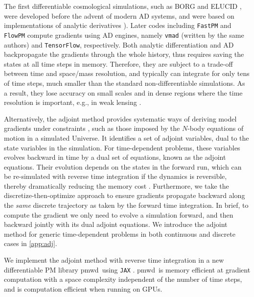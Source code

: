 \documentclass[modern, trackchanges, dvipsnames]{aastex631}
\newcommand{\pmwd}{{\usefont{T1}{nova}{m}{sl}pmwd}}
\begin{document}
The first differentiable cosmological simulations, such as BORG and
ELUCID \citep{BORG, ELUCID}, were developed before the advent of modern
AD systems, and were based on implementations of analytic derivatives
\citep[see e.g.,][App.~D]{SeljakEtAl2017}).
Later codes including \texttt{FastPM} and \texttt{FlowPM} \citep{FastPM,
vmad, SeljakEtAl2017, FlowPM} compute gradients using AD engines, namely
\texttt{vmad} (written by the same authors) and \texttt{TensorFlow},
respectively.
Both analytic differentiation and AD backpropagate the gradients through
the whole history, thus requires saving the states at all time steps in
memory.
Therefore, they are subject to a trade-off between time and space/mass
resolution, and typically can integrate for only tens of time steps,
much smaller than the standard non-differentiable simulations.
As a result, they lose accuracy on small scales and in dense regions
where the time resolution is important, e.g., in weak lensing
\citep{MADLens}.

Alternatively, the adjoint method provides systematic ways of deriving
model gradients under constraints \citep{Pontryagin1962}, such as those
imposed by the $N$-body equations of motion in a simulated Universe.
It identifies a set of adjoint variables, dual to the state variables in
the simulation.
For time-dependent problems, these variables evolves backward in time by
a dual set of equations, known as the adjoint equations.
Their evolution depends on the states in the forward run, which can be
re-simulated with reverse time integration if the dynamics is
reversible, thereby dramatically reducing the memory cost
\citep{NeuralODE}.
Furthermore, we take the discretize-then-optimize approach
\citep[e.g.,][]{ANODE} to ensure gradients propagate backward along the
\emph{same} discrete trajectory as taken by the forward time
integration.
In brief, to compute the gradient we only need to evolve a simulation
forward, and then backward jointly with its dual adjoint equations.
We introduce the adjoint method for generic time-dependent problems in
both continuous and discrete cases in \autoref{app:adj}.

We implement the adjoint method with reverse time integration in a new
differentiable PM library \pmwd\ using \texttt{JAX} \citep{pmwd}.
\pmwd\ is memory efficient at gradient computation with a space
complexity independent of the number of time steps, and is computation
efficient when running on GPUs.
\end{document}
